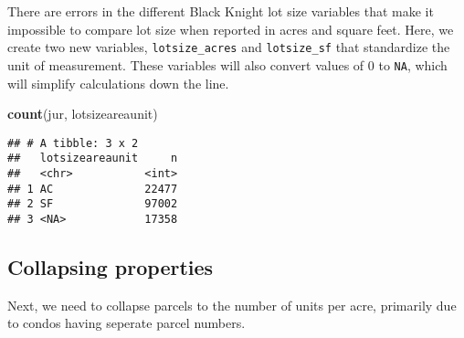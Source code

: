 \documentclass[]{article}
\newenvironment{Shaded}{\begin{snugshade}}{\end{snugshade}}
\newcommand{\KeywordTok}[1]{\textcolor[rgb]{0.13,0.29,0.53}{\textbf{#1}}}
\newcommand{\DataTypeTok}[1]{\textcolor[rgb]{0.13,0.29,0.53}{#1}}
\newcommand{\DecValTok}[1]{\textcolor[rgb]{0.00,0.00,0.81}{#1}}
\newcommand{\StringTok}[1]{\textcolor[rgb]{0.31,0.60,0.02}{#1}}
\newcommand{\OtherTok}[1]{\textcolor[rgb]{0.56,0.35,0.01}{#1}}
\newcommand{\OperatorTok}[1]{\textcolor[rgb]{0.81,0.36,0.00}{\textbf{#1}}}
\newcommand{\NormalTok}[1]{#1}
\begin{document}
There are errors in the different Black Knight lot size variables that
make it impossible to compare lot size when reported in acres and square
feet. Here, we create two new variables, \texttt{lotsize\_acres} and
\texttt{lotsize\_sf} that standardize the unit of measurement. These
variables will also convert values of 0 to \texttt{NA}, which will
simplify calculations down the line.

\begin{Shaded}
\begin{Highlighting}[]
\KeywordTok{count}\NormalTok{(jur, lotsizeareaunit)}
\end{Highlighting}
\end{Shaded}

\begin{verbatim}
## # A tibble: 3 x 2
##   lotsizeareaunit     n
##   <chr>           <int>
## 1 AC              22477
## 2 SF              97002
## 3 <NA>            17358
\end{verbatim}

\begin{Shaded}
\end{Shaded}

\subsection{Collapsing properties}\label{collapsing-properties}

Next, we need to collapse parcels to the number of units per acre,
primarily due to condos having seperate parcel numbers.
\end{document}
